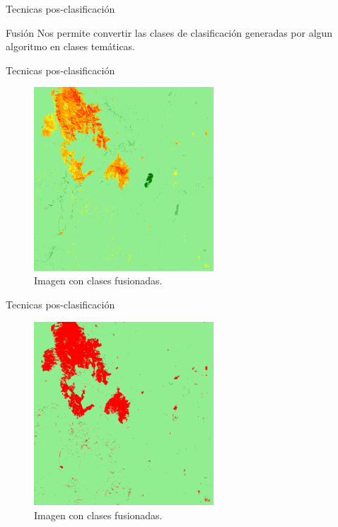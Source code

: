 \documentclass[]{beamer}
\begin{document}
\begin{frame}{Tecnicas pos-clasificación}
  \begin{block}{Fusión}
    Nos permite convertir las clases de clasificación generadas por algun algoritmo en clases temáticas.
  \end{block}
\end{frame}

\begin{frame}{Tecnicas pos-clasificación}
  \begin{figure}
    \includegraphics[width=0.6\textwidth]{imagenes/im_class.png}
    \caption{Imagen con clases fusionadas.}
  \end{figure}
\end{frame}

\begin{frame}{Tecnicas pos-clasificación}
  \begin{figure}
    \includegraphics[width=0.6\textwidth]{imagenes/im_fus.png}
    \caption{Imagen con clases fusionadas.}
  \end{figure}
\end{frame}
\end{document}
